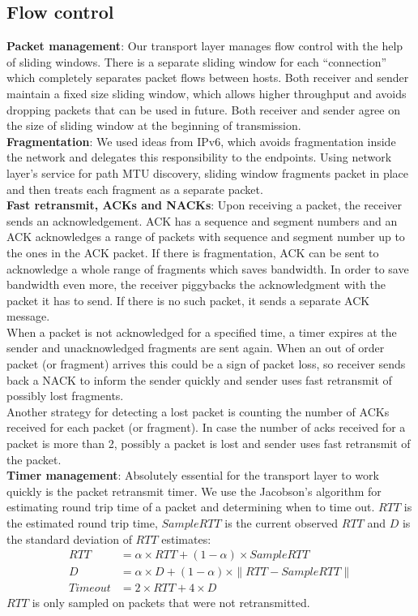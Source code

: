 \documentclass[11pt,a4paper,oneside]{report}
\begin{document}
\subsection{Flow control}
\noindent \textbf{Packet management}: Our transport layer manages flow control
with the help of sliding windows. There is a separate sliding window for each
``connection'' which completely separates packet flows between hosts. Both
receiver and sender maintain a fixed size sliding window, which allows higher
throughput and avoids dropping packets that can be used in future. Both receiver
and sender agree on the size of sliding window at the
beginning of transmission. \\
\noindent \textbf{Fragmentation}: We used ideas from IPv6, which avoids
fragmentation inside the network and delegates this responsibility to the
endpoints. Using network layer's service for path MTU discovery, sliding window
fragments packet in place and then treats each fragment as a separate packet. \\
\noindent \textbf{Fast retransmit, ACKs and NACKs}: Upon receiving a packet, the
receiver sends an acknowledgement. ACK has a sequence and segment numbers and an
ACK acknowledges a range of packets with sequence and segment number up to the
ones in the ACK packet. If there is fragmentation, ACK can be sent to
acknowledge a whole range of fragments which saves bandwidth. In order to save bandwidth
even more, the receiver piggybacks the acknowledgment with the packet it has to
send. If there is no such packet, it sends a separate ACK message. \\ When a
packet is not acknowledged for a specified time, a timer expires at the sender
and unacknowledged fragments are sent again. When an out of order packet (or
fragment) arrives this could be a sign of packet loss, so receiver sends back a
NACK to inform the sender quickly and sender uses fast retransmit of
possibly lost fragments. \\ 
Another strategy for detecting a lost packet is counting the number of ACKs
received for each packet (or fragment). In case the number of acks received for
a packet is more than 2, possibly a packet is lost and sender uses fast
retransmit of the packet. \\
\noindent \textbf{Timer management}:
Absolutely essential for the transport layer to work quickly is the packet
retransmit timer. We use the Jacobson's algorithm for estimating round trip time 
of a packet and determining when to time out. $RTT$ is the estimated round trip
time, $SampleRTT$ is the current observed $RTT$ and $D$ is the standard
deviation of $RTT$ estimates:
\begin{align}
RTT & = \alpha \times RTT + (1-\alpha) \times SampleRTT \\
D & = \alpha \times D + (1-\alpha) \times \|RTT-SampleRTT\| \\
Timeout & = 2 \times RTT+4 \times D
\end{align}
$RTT$ is only sampled on packets that were not retransmitted. \\
\end{document}
